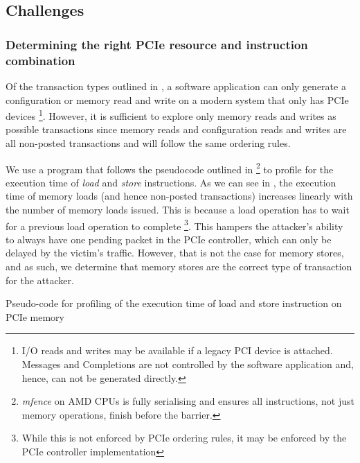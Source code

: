 \subsection{Challenges}
\label{subsec:interconnect-sc-store-ops-challenges}


\subsubsection{Determining the right PCIe resource and instruction combination}

Of the transaction types outlined in , a software application can only generate a configuration or memory read and write on a modern system that only has PCIe devices
\footnote{I/O reads and writes may be available if a legacy PCI device is attached.
Messages and Completions are not controlled by the software application and, hence, can not be generated directly.}.
However, it is sufficient to explore only memory reads and writes as possible transactions since memory reads and configuration reads and writes are all non-posted transactions and will follow the same ordering rules.

We use a program that follows the pseudocode outlined in 
\footnote{\textit{mfence} on AMD CPUs is fully serialising and ensures all instructions, not just memory operations, finish before the barrier.}
to profile for the execution time of \textit{load} and \textit{store} instructions.
As we can see in , the execution time of memory loads (and hence non-posted transactions) increases linearly with the number of memory loads issued.
This is because a load operation has to wait for a previous load operation to complete 
\footnote{While this is not enforced by PCIe ordering rules, it may be enforced by the PCIe controller implementation}.
This hampers the attacker's ability to always have one pending packet in the PCIe controller, which can only be delayed by the victim's traffic.
However, that is not the case for memory stores, and as such, we determine that memory stores are the correct type of transaction for the attacker.

\begin{minipage}{\textwidth}

\captionsetup{type=lstlisting}
\caption{Pseudo-code for profiling of the execution time of load and store instruction on PCIe memory}
\label{lst:pcie-mem-reads-v-writes}
\end{minipage}


